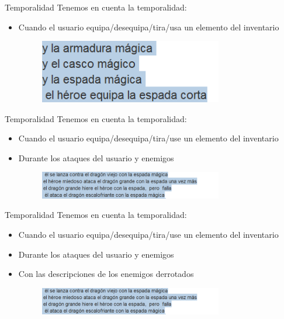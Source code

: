 \begin{tframe}{Temporalidad}
	Tenemos en cuenta la temporalidad:
	\begin{itemize}
		\item<+-| alert@+> Cuando el usuario equipa/desequipa/tira/usa un elemento del inventario
		\begin{figure}[h]
			\includegraphics[width=8cm]{../img/temporalidadEquipar.PNG}
		\end{figure}
	\end{itemize}
\end{tframe}

\begin{tframe}{Temporalidad}
	Tenemos en cuenta la temporalidad:
	\begin{itemize}
		\item Cuando el usuario equipa/desequipa/tira/use un elemento del inventario
		\item<+-| alert@+> Durante los ataques del usuario y enemigos
		\begin{figure}[h]
			\includegraphics[width=8cm]{../img/temporalidadAtaque.PNG}
		\end{figure}
	\end{itemize}
\end{tframe}

\begin{tframe}{Temporalidad}
	Tenemos en cuenta la temporalidad:
	\begin{itemize}
		\item Cuando el usuario equipa/desequipa/tira/use un elemento del inventario
		\item Durante los ataques del usuario y enemigos
		\item<+-| alert@+> Con las descripciones de los enemigos derrotados
		\begin{figure}[h]
			\includegraphics[width=8cm]{../img/temporalidadAtaque.PNG}
		\end{figure}
	\end{itemize}
\end{tframe}

